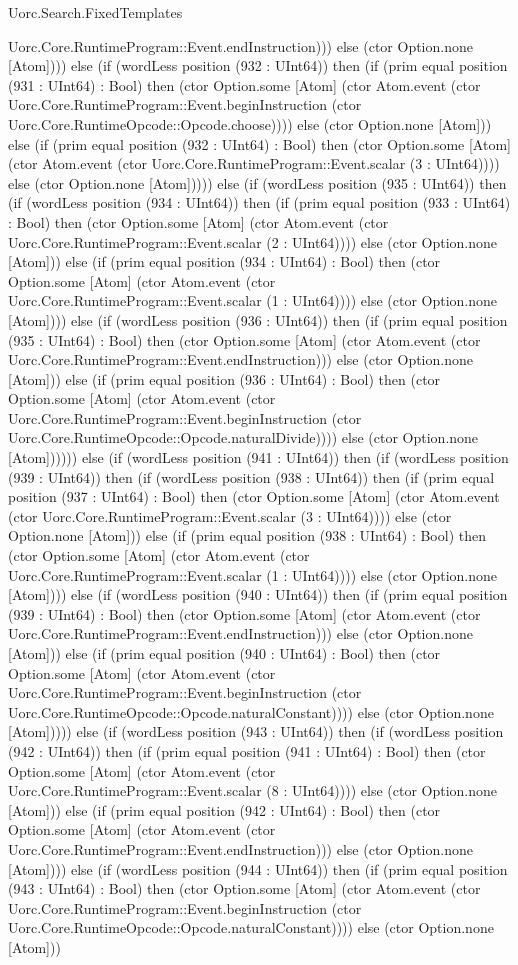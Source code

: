 \begin{lexlean}{Uorc.Search.FixedTemplates}
\begin{semanticmodule}
{Uorc.Core.RuntimeProgram::Event.endInstruction))) else (ctor Option.none [Atom]))) else (if (wordLess position (932 : UInt64)) then (if (prim equal position (931 : UInt64) : Bool) then (ctor Option.some [Atom] (ctor Atom.event (ctor Uorc.Core.RuntimeProgram::Event.beginInstruction (ctor Uorc.Core.RuntimeOpcode::Opcode.choose)))) else (ctor Option.none [Atom])) else (if (prim equal position (932 : UInt64) : Bool) then (ctor Option.some [Atom] (ctor Atom.event (ctor Uorc.Core.RuntimeProgram::Event.scalar (3 : UInt64)))) else (ctor Option.none [Atom])))) else (if (wordLess position (935 : UInt64)) then (if (wordLess position (934 : UInt64)) then (if (prim equal position (933 : UInt64) : Bool) then (ctor Option.some [Atom] (ctor Atom.event (ctor Uorc.Core.RuntimeProgram::Event.scalar (2 : UInt64)))) else (ctor Option.none [Atom])) else (if (prim equal position (934 : UInt64) : Bool) then (ctor Option.some [Atom] (ctor Atom.event (ctor Uorc.Core.RuntimeProgram::Event.scalar (1 : UInt64)))) else (ctor Option.none [Atom]))) else (if (wordLess position (936 : UInt64)) then (if (prim equal position (935 : UInt64) : Bool) then (ctor Option.some [Atom] (ctor Atom.event (ctor Uorc.Core.RuntimeProgram::Event.endInstruction))) else (ctor Option.none [Atom])) else (if (prim equal position (936 : UInt64) : Bool) then (ctor Option.some [Atom] (ctor Atom.event (ctor Uorc.Core.RuntimeProgram::Event.beginInstruction (ctor Uorc.Core.RuntimeOpcode::Opcode.naturalDivide)))) else (ctor Option.none [Atom]))))) else (if (wordLess position (941 : UInt64)) then (if (wordLess position (939 : UInt64)) then (if (wordLess position (938 : UInt64)) then (if (prim equal position (937 : UInt64) : Bool) then (ctor Option.some [Atom] (ctor Atom.event (ctor Uorc.Core.RuntimeProgram::Event.scalar (3 : UInt64)))) else (ctor Option.none [Atom])) else (if (prim equal position (938 : UInt64) : Bool) then (ctor Option.some [Atom] (ctor Atom.event (ctor Uorc.Core.RuntimeProgram::Event.scalar (1 : UInt64)))) else (ctor Option.none [Atom]))) else (if (wordLess position (940 : UInt64)) then (if (prim equal position (939 : UInt64) : Bool) then (ctor Option.some [Atom] (ctor Atom.event (ctor Uorc.Core.RuntimeProgram::Event.endInstruction))) else (ctor Option.none [Atom])) else (if (prim equal position (940 : UInt64) : Bool) then (ctor Option.some [Atom] (ctor Atom.event (ctor Uorc.Core.RuntimeProgram::Event.beginInstruction (ctor Uorc.Core.RuntimeOpcode::Opcode.naturalConstant)))) else (ctor Option.none [Atom])))) else (if (wordLess position (943 : UInt64)) then (if (wordLess position (942 : UInt64)) then (if (prim equal position (941 : UInt64) : Bool) then (ctor Option.some [Atom] (ctor Atom.event (ctor Uorc.Core.RuntimeProgram::Event.scalar (8 : UInt64)))) else (ctor Option.none [Atom])) else (if (prim equal position (942 : UInt64) : Bool) then (ctor Option.some [Atom] (ctor Atom.event (ctor Uorc.Core.RuntimeProgram::Event.endInstruction))) else (ctor Option.none [Atom]))) else (if (wordLess position (944 : UInt64)) then (if (prim equal position (943 : UInt64) : Bool) then (ctor Option.some [Atom] (ctor Atom.event (ctor Uorc.Core.RuntimeProgram::Event.beginInstruction (ctor Uorc.Core.RuntimeOpcode::Opcode.naturalConstant)))) else (ctor Option.none [Atom])) }
\end{semanticmodule}
\end{lexlean}
